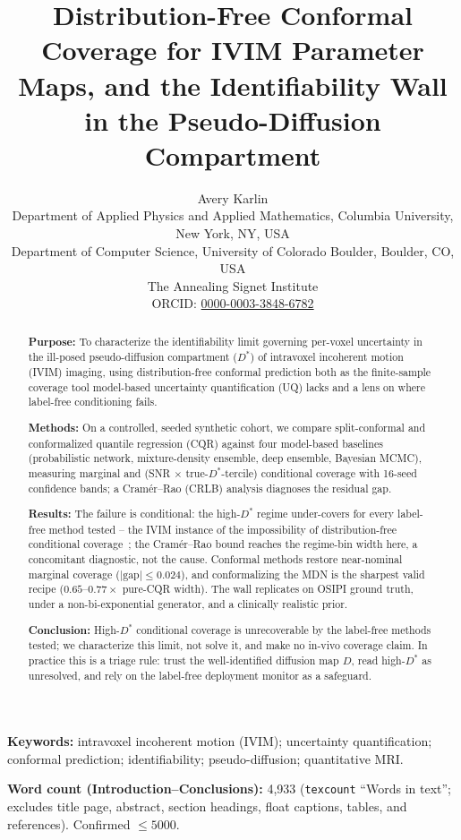\documentclass[11pt]{article}
\title{\textbf{Distribution-Free Conformal Coverage for IVIM Parameter
Maps, and the Identifiability Wall in the Pseudo-Diffusion Compartment}}
\author{Avery Karlin\\[3pt]
\small Department of Applied Physics and Applied Mathematics, Columbia University, New York, NY, USA\\[1pt]
\small Department of Computer Science, University of Colorado Boulder, Boulder, CO, USA\\[1pt]
\small The Annealing Signet Institute\\[3pt]
\small ORCID: \href{https://orcid.org/0000-0003-3848-6782}{0000-0003-3848-6782}}
\date{}
\newcommand{\Dstar}{D^{*}}
\begin{document}
\maketitle

\begin{abstract}
\noindent
\textbf{Purpose:} To characterize the identifiability limit governing per-voxel
uncertainty in the ill-posed pseudo-diffusion compartment ($\Dstar$) of intravoxel
incoherent motion (IVIM) imaging, using distribution-free conformal prediction both
as the finite-sample coverage tool model-based uncertainty quantification (UQ) lacks
and a lens on where label-free conditioning fails.

\noindent
\textbf{Methods:} On a controlled, seeded synthetic cohort, we compare
split-conformal and conformalized quantile regression (CQR) against four model-based
baselines (probabilistic network, mixture-density ensemble, deep ensemble, Bayesian
MCMC), measuring marginal and (SNR $\times$ true-$\Dstar$-tercile) conditional
coverage with 16-seed confidence bands; a Cram\'er--Rao (CRLB) analysis
diagnoses the residual gap.

\noindent
\textbf{Results:} The failure is conditional: the high-$\Dstar$ regime
under-covers for every label-free method tested -- the IVIM instance of the
impossibility of distribution-free conditional coverage~\citep{barber2021limits};
the Cram\'er--Rao bound reaches the regime-bin width here, a concomitant diagnostic,
not the cause. Conformal methods restore near-nominal marginal coverage
($|\text{gap}|\le 0.024$), and conformalizing the MDN is the sharpest valid recipe
($0.65$--$0.77\times$ pure-CQR width). The wall replicates on OSIPI ground truth,
under a non-bi-exponential generator, and a clinically realistic prior.

\noindent
\textbf{Conclusion:} High-$\Dstar$ conditional coverage is unrecoverable by the
label-free methods tested; we characterize this limit, not solve it, and make no
in-vivo coverage claim. In practice this is a triage rule: trust the well-identified
diffusion map $D$, read high-$\Dstar$ as unresolved, and rely on the label-free
deployment monitor as a safeguard.
\end{abstract}

\vspace{0.5em}
\noindent\textbf{Keywords:} intravoxel incoherent motion (IVIM); uncertainty
quantification; conformal prediction; identifiability; pseudo-diffusion;
quantitative MRI.

\vspace{0.5em}
\noindent\textbf{Word count (Introduction--Conclusions):} 4,933
(\texttt{texcount} ``Words in text''; excludes title page, abstract, section
headings, float captions, tables, and references). Confirmed $\le 5000$.
\end{document}
